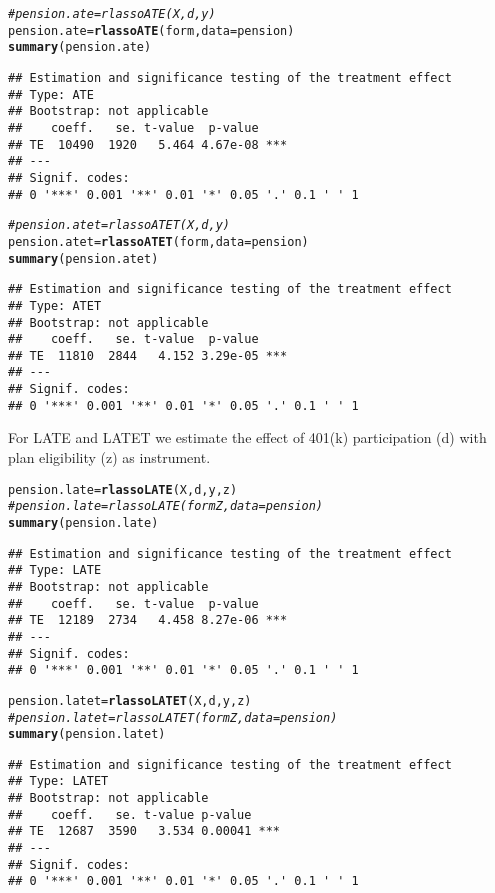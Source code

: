 \documentclass{amsart}\usepackage[]{graphicx}\usepackage[]{color}
\makeatletter
\newcommand{\hlcom}[1]{\textcolor[rgb]{0.678,0.584,0.686}{\textit{#1}}}%
\newcommand{\hlstd}[1]{\textcolor[rgb]{0.345,0.345,0.345}{#1}}%
\newcommand{\hlkwb}[1]{\textcolor[rgb]{0.69,0.353,0.396}{#1}}%
\newcommand{\hlkwc}[1]{\textcolor[rgb]{0.333,0.667,0.333}{#1}}%
\newcommand{\hlkwd}[1]{\textcolor[rgb]{0.737,0.353,0.396}{\textbf{#1}}}%
\newenvironment{kframe}{%
 \def\at@end@of@kframe{}%
 \ifinner\ifhmode%
  \def\at@end@of@kframe{\end{minipage}}%
  \begin{minipage}{\columnwidth}%
 \fi\fi%
 \def\FrameCommand##1{\hskip\@totalleftmargin \hskip-\fboxsep
 \colorbox{shadecolor}{##1}\hskip-\fboxsep
     \hskip-\linewidth \hskip-\@totalleftmargin \hskip\columnwidth}%
 \MakeFramed {\advance\hsize-\width
   \@totalleftmargin\z@ \linewidth\hsize
   \@setminipage}}%
 {\par\unskip\endMakeFramed%
 \at@end@of@kframe}
\newenvironment{knitrout}{}{} %
\makeatother
\begin{document}
\begin{knitrout}
\color{fgcolor}\begin{kframe}
\begin{alltt}
\hlcom{# pension.ate = rlassoATE(X,d,y)}
\hlstd{pension.ate} \hlkwb{=} \hlkwd{rlassoATE}\hlstd{(form,} \hlkwc{data} \hlstd{= pension)}
\hlkwd{summary}\hlstd{(pension.ate)}
\end{alltt}
\begin{verbatim}
## Estimation and significance testing of the treatment effect 
## Type: ATE 
## Bootstrap: not applicable 
##    coeff.   se. t-value  p-value    
## TE  10490  1920   5.464 4.67e-08 ***
## ---
## Signif. codes:  
## 0 '***' 0.001 '**' 0.01 '*' 0.05 '.' 0.1 ' ' 1
\end{verbatim}
\begin{alltt}
\hlcom{# pension.atet = rlassoATET(X,d,y)}
\hlstd{pension.atet} \hlkwb{=} \hlkwd{rlassoATET}\hlstd{(form,} \hlkwc{data} \hlstd{= pension)}
\hlkwd{summary}\hlstd{(pension.atet)}
\end{alltt}
\begin{verbatim}
## Estimation and significance testing of the treatment effect 
## Type: ATET 
## Bootstrap: not applicable 
##    coeff.   se. t-value  p-value    
## TE  11810  2844   4.152 3.29e-05 ***
## ---
## Signif. codes:  
## 0 '***' 0.001 '**' 0.01 '*' 0.05 '.' 0.1 ' ' 1
\end{verbatim}
\end{kframe}
\end{knitrout}
For LATE and LATET we estimate the effect of 401(k) participation (d) with plan eligibility (z) as instrument.

\begin{knitrout}
\color{fgcolor}\begin{kframe}
\begin{alltt}
\hlstd{pension.late} \hlkwb{=} \hlkwd{rlassoLATE}\hlstd{(X, d, y, z)}
\hlcom{# pension.late = rlassoLATE(formZ, data=pension)}
\hlkwd{summary}\hlstd{(pension.late)}
\end{alltt}
\begin{verbatim}
## Estimation and significance testing of the treatment effect 
## Type: LATE 
## Bootstrap: not applicable 
##    coeff.   se. t-value  p-value    
## TE  12189  2734   4.458 8.27e-06 ***
## ---
## Signif. codes:  
## 0 '***' 0.001 '**' 0.01 '*' 0.05 '.' 0.1 ' ' 1
\end{verbatim}
\begin{alltt}
\hlstd{pension.latet} \hlkwb{=} \hlkwd{rlassoLATET}\hlstd{(X, d, y, z)}
\hlcom{# pension.latet = rlassoLATET(formZ, data=pension)}
\hlkwd{summary}\hlstd{(pension.latet)}
\end{alltt}
\begin{verbatim}
## Estimation and significance testing of the treatment effect 
## Type: LATET 
## Bootstrap: not applicable 
##    coeff.   se. t-value p-value    
## TE  12687  3590   3.534 0.00041 ***
## ---
## Signif. codes:  
## 0 '***' 0.001 '**' 0.01 '*' 0.05 '.' 0.1 ' ' 1
\end{verbatim}
\end{kframe}
\end{knitrout}
\end{document}
